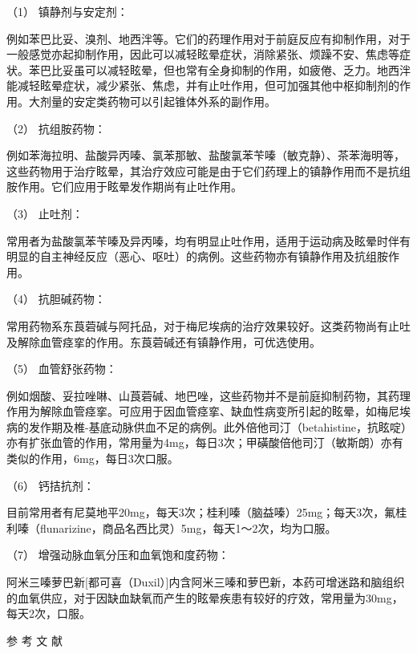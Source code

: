 \hypertarget{text00012.htmlux5cux23CHP1-3-3-3-3-1}{}
（1） 镇静剂与安定剂：

例如苯巴比妥、溴剂、地西泮等。它们的药理作用对于前庭反应有抑制作用，对于一般感觉亦起抑制作用，因此可以减轻眩晕症状，消除紧张、烦躁不安、焦虑等症状。苯巴比妥虽可以减轻眩晕，但也常有全身抑制的作用，如疲倦、乏力。地西泮能减轻眩晕症状，减少紧张、焦虑，并有止吐作用，但可加强其他中枢抑制剂的作用。大剂量的安定类药物可以引起锥体外系的副作用。

\hypertarget{text00012.htmlux5cux23CHP1-3-3-3-3-2}{}
（2） 抗组胺药物：

例如苯海拉明、盐酸异丙嗪、氯苯那敏、盐酸氯苯苄嗪（敏克静）、茶苯海明等，这些药物用于治疗眩晕，其治疗效应可能是由于它们药理上的镇静作用而不是抗组胺作用。它们应用于眩晕发作期尚有止吐作用。

\hypertarget{text00012.htmlux5cux23CHP1-3-3-3-3-3}{}
（3） 止吐剂：

常用者为盐酸氯苯苄嗪及异丙嗪，均有明显止吐作用，适用于运动病及眩晕时伴有明显的自主神经反应（恶心、呕吐）的病例。这些药物亦有镇静作用及抗组胺作用。

\hypertarget{text00012.htmlux5cux23CHP1-3-3-3-3-4}{}
（4） 抗胆碱药物：

常用药物系东莨菪碱与阿托品，对于梅尼埃病的治疗效果较好。这类药物尚有止吐及解除血管痉挛的作用。东莨菪碱还有镇静作用，可优选使用。

\hypertarget{text00012.htmlux5cux23CHP1-3-3-3-3-5}{}
（5） 血管舒张药物：

例如烟酸、妥拉唑啉、山莨菪碱、地巴唑，这些药物并不是前庭抑制药物，其药理作用为解除血管痉挛。可应用于因血管痉挛、缺血性病变所引起的眩晕，如梅尼埃病的发作期及椎-基底动脉供血不足的病例。此外倍他司汀（betahistine，抗眩啶）亦有扩张血管的作用，常用量为4mg，每日3次；甲磺酸倍他司汀（敏斯朗）亦有类似的作用，6mg，每日3次口服。

\hypertarget{text00012.htmlux5cux23CHP1-3-3-3-3-6}{}
（6） 钙拮抗剂：

目前常用者有尼莫地平20mg，每天3次；桂利嗪（脑益嗪）25mg；每天3次，氟桂利嗪（flunarizine，商品名西比灵）5mg，每天1～2次，均为口服。

\hypertarget{text00012.htmlux5cux23CHP1-3-3-3-3-7}{}
（7） 增强动脉血氧分压和血氧饱和度药物：

阿米三嗪萝巴新{[}都可喜（Duxil）{]}内含阿米三嗪和萝巴新，本药可增迷路和脑组织的血氧供应，对于因缺血缺氧而产生的眩晕疾患有较好的疗效，常用量为30mg，每天2次，口服。


\hypertarget{text00013.htmlux5cux23CHP1-3-4}{}
参 考 文 献

